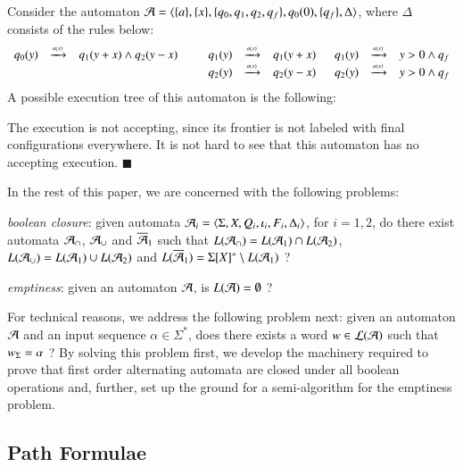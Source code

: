 \begin{example}\label{ex:foada}
  Consider the automaton $\mathcal{A} = \langle \{ a \}, \{ x \},
    \{ q_0,q_1,q_2,q_f \}, q_0(0), \{ q_f \}, \Delta \rangle$, where $\Delta$
  consists of the rules below:
  \[\begin{array}{rclcrclcrcl}
  q_0(y) & \xrightarrow{{\scriptscriptstyle a(x)}}_{{\scriptstyle }} & q_1(y+x) \wedge q_2(y-x) & \hspace*{2mm} &
  q_1(y) & \xrightarrow{{\scriptscriptstyle a(x)}}_{{\scriptstyle }} & q_1(y+x) \hspace*{2mm} &
  q_1(y) & \xrightarrow{{\scriptscriptstyle a(x)}}_{{\scriptstyle }} & y > 0 \wedge q_f \\ 
  &&&& q_2(y) & \xrightarrow{{\scriptscriptstyle a(x)}}_{{\scriptstyle }} & q_2(y-x) &
  q_2(y) & \xrightarrow{{\scriptscriptstyle a(x)}}_{{\scriptstyle }} & y > 0 \wedge q_f
  \end{array}\]
  A possible execution tree of this automaton is the following:
  \begin{center}
    
  \end{center}
  The execution is not accepting, since its frontier is not labeled
  with final configurations everywhere. It is not hard to see that
  this automaton has no accepting execution. \hfill$\blacksquare$
\end{example}

In the rest of this paper, we are concerned with the following
problems: \begin{compactenum}
\item \emph{boolean closure}: given automata $\mathcal{A}_i =
  \langle \Sigma,X,Q_i,\iota_i,F_i,\Delta_i \rangle$, for $i=1,2$, do there
  exist automata $\mathcal{A}_\cap$, $\mathcal{A}_\cup$ and $\overline{\mathcal{A}}_1$ such that
  $L(\mathcal{A}_\cap) = L(\mathcal{A}_1) \cap L(\mathcal{A}_2)$, $L(\mathcal{A}_\cup) = L(\mathcal{A}_1) \cup
  L(\mathcal{A}_2)$ and $L(\overline{\mathcal{A}}_1) = \Sigma[X]^* \setminus L(\mathcal{A}_1)$ ?
%
\item \emph{emptiness}: given an automaton $\mathcal{A}$, is $L(\mathcal{A}) =
  \emptyset$ ?
\end{compactenum}
For technical reasons, we address the following problem next: given an
automaton $\mathcal{A}$ and an input sequence $\alpha \in \Sigma^*$, does there
exists a word $w \in {\mathcal L}({\mathcal{A}})$ such that ${w}_\Sigma = \alpha$ ?  By
solving this problem first, we develop the machinery required to prove
that first order alternating automata are closed under all boolean
operations and, further, set up the ground for a semi-algorithm for
the emptiness problem.

\subsection{Path Formulae}
\label{sec:path-formulae}

